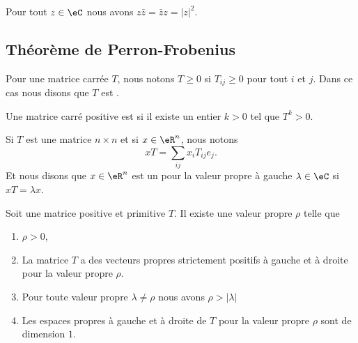 \begin{lemma}   \label{LEMooONLNooXLNbtB}
	Pour tout \( z\in \eC\) nous avons \( z\bar z=\bar z z=| z |^2\).
\end{lemma}

\subsection{Théorème de Perron-Frobenius}

\begin{definition}
	Pour une matrice carrée \( T\), nous notons \( T\geq 0\) si \( T_{ij}\geq 0\) pour tout \( i\) et \( j\). Dans ce cas nous disons que \( T\) est .

	Une matrice carré positive est  si il existe un entier \( k>0\) tel que \( T^k>0\).
\end{definition}

\begin{definition}      \label{DEFooRFQCooQrLPVw}
	Si \( T\) est une matrice \( n\times n\) et si \( x\in \eR^n\), nous notons
	\begin{equation}
		xT=\sum_{ij}x_iT_{ij}e_j.
	\end{equation}
	Et nous disons que \( x\in \eR^n\) est un  pour la valeur propre à gauche \( \lambda\in \eC\) si \( xT=\lambda x\).
\end{definition}

\begin{theorem}       \label{THOooRSPJooMCFeeP}
	Soit une matrice positive et primitive \( T\). Il existe une valeur propre \( \rho\) telle que
	\begin{enumerate}
		\item
		      \( \rho>0\),
		\item
		      La matrice \( T\) a des vecteurs propres strictement positifs à gauche et à droite pour la valeur propre \( \rho\).
		\item
		      Pour toute valeur propre \( \lambda\neq \rho\) nous avons \( \rho>| \lambda |\)
		\item
		      Les espaces propres à gauche et à droite de \( T\) pour la valeur propre \( \rho\) sont de dimension \( 1\).
	\end{enumerate}
\end{theorem}

